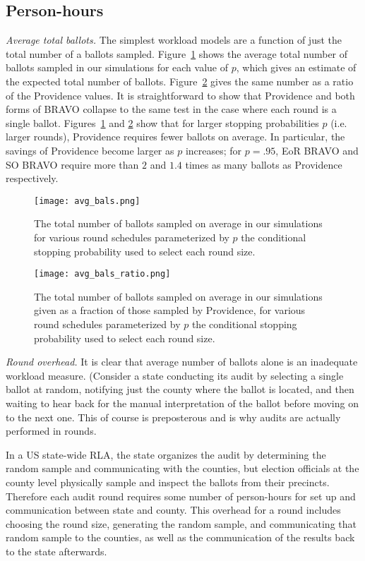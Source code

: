 \subsection{Person-hours}

\emph{Average total ballots.} The simplest workload models are a function of just the total number of a ballots sampled. Figure~\ref{fig:avg_bals} shows the average total number of ballots sampled in our simulations for each value of $p$, which gives an estimate of the expected total number of ballots.
Figure~\ref{fig:avg_bals_ratio} gives the same number as a ratio of the Providence values.
It is straightforward to show that Providence and both forms of BRAVO collapse to the same test in the case where each round is a single ballot. Figures~\ref{fig:avg_bals} and \ref{fig:avg_bals_ratio} show that for larger stopping probabilities $p$ (i.e. larger rounds), Providence requires fewer ballots on average. In particular, the savings of Providence become larger as $p$ increases; for $p=.95$, EoR BRAVO and SO BRAVO require more than $2$ and $1.4$ times as many ballots as Providence respectively. 

\begin{figure}
\texttt{[image: avg\_bals.png]}
\caption{The total number of ballots sampled on average in our simulations for various round schedules parameterized by $p$ the conditional stopping probability used to select each round size.}
\label{fig:avg_bals}
\end{figure}

\begin{figure}
\texttt{[image: avg\_bals\_ratio.png]}
\caption{The total number of ballots sampled on average in our simulations given as a fraction of those sampled by Providence, for various round schedules parameterized by $p$ the conditional stopping probability used to select each round size.}
\label{fig:avg_bals_ratio}
\end{figure}


\emph{Round overhead.} It is clear that average number of ballots alone is an inadequate workload measure. 
(Consider a state conducting its audit by selecting a single ballot at random, 
notifying just the county where the ballot is located, and then waiting to hear back for the manual interpretation of the ballot before moving on to the next one. 
This of course is preposterous and is why audits are actually performed in rounds.

In a US state-wide RLA, the state organizes the audit by determining the random sample and communicating with the counties, but election officials at the county level physically sample and inspect the ballots from their precincts. 
Therefore each audit round requires some number of person-hours for set up and communication between state and county. This overhead for a round includes choosing the round size, generating the random sample, and communicating that random sample to the counties, as well as the communication of the results back to the state afterwards. 

